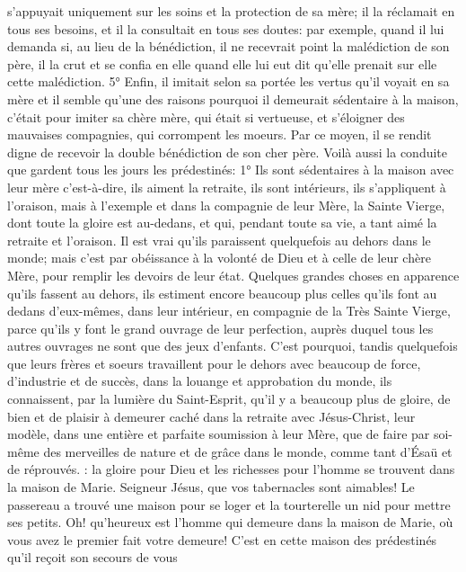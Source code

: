 s'appuyait uniquement sur les soins et la protection de sa mère; il la réclamait en tous ses besoins, et il la
consultait en tous ses doutes: par exemple, quand il lui demanda si, au lieu de la bénédiction, il ne recevrait point
la malédiction de son père, il la crut et se confia en elle quand elle lui eut dit qu'elle prenait sur elle cette
malédiction.
 5° Enfin, il imitait selon sa portée les vertus qu'il voyait en sa mère et il semble qu'une des raisons pourquoi il
demeurait sédentaire à la maison, c'était pour imiter sa chère mère, qui était si vertueuse, et s'éloigner des
mauvaises compagnies, qui corrompent les moeurs. Par ce moyen, il se rendit digne de recevoir la double
bénédiction de son cher père.
 Voilà aussi la conduite que gardent tous les jours les prédestinés:
1° Ils sont sédentaires à la maison avec leur mère c'est-à-dire, ils aiment la retraite, ils sont intérieurs, ils
s'appliquent à l'oraison, mais à l'exemple et dans la compagnie de leur Mère, la Sainte Vierge, dont toute la gloire
est au-dedans, et qui, pendant toute sa vie, a tant aimé la retraite et l'oraison. Il est vrai qu'ils paraissent
quelquefois au dehors dans le monde; mais c'est par obéissance à la volonté de Dieu et à celle de leur chère
Mère, pour remplir les devoirs de leur état. Quelques grandes choses en apparence qu'ils fassent au dehors, ils
estiment encore beaucoup plus celles qu'ils font au dedans d'eux-mêmes, dans leur intérieur, en compagnie de la
Très Sainte Vierge, parce qu'ils y font le grand ouvrage de leur perfection, auprès duquel tous les autres ouvrages
ne sont que des jeux d'enfants. C'est pourquoi, tandis quelquefois que leurs frères et soeurs travaillent pour le
dehors avec beaucoup de force, d'industrie et de succès, dans la louange et approbation du monde, ils
connaissent, par la lumière du Saint-Esprit, qu'il y a beaucoup plus de gloire, de bien et de plaisir à demeurer
caché dans la retraite avec Jésus-Christ, leur modèle, dans une entière et parfaite soumission à leur Mère, que de
faire par soi-même des merveilles de nature et de grâce dans le monde, comme tant d'Ésaü et de réprouvés.
: la gloire pour Dieu et les richesses pour l'homme se trouvent dans la maison de
Marie.
Seigneur Jésus, que vos tabernacles sont aimables! Le passereau a trouvé une maison pour se loger et la
tourterelle un nid pour mettre ses petits. Oh! qu'heureux est l'homme qui demeure dans la maison de Marie, où
vous avez le premier fait votre demeure! C'est en cette maison des prédestinés qu'il reçoit son secours de vous
